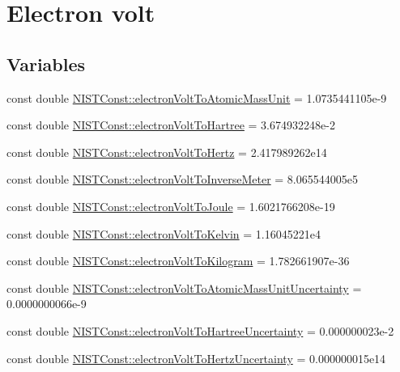 \hypertarget{group___n_i_s_t_const-_electron_volt}{}\section{Electron volt}
\label{group___n_i_s_t_const-_electron_volt}
\subsection*{Variables}
\begin{DoxyCompactItemize}
\item 
const double \hyperlink{group___n_i_s_t_const-_electron_volt_gabd56c1195e7ce2bb9c314e88b43e30ab}{N\+I\+S\+T\+Const\+::electron\+Volt\+To\+Atomic\+Mass\+Unit} = 1.\+0735441105e-\/9
\item 
const double \hyperlink{group___n_i_s_t_const-_electron_volt_gab05ba497cc5a6bd566356469e9de003a}{N\+I\+S\+T\+Const\+::electron\+Volt\+To\+Hartree} = 3.\+674932248e-\/2
\item 
const double \hyperlink{group___n_i_s_t_const-_electron_volt_gae80c1242d33bf681a09a87d20cd4162e}{N\+I\+S\+T\+Const\+::electron\+Volt\+To\+Hertz} = 2.\+417989262e14
\item 
const double \hyperlink{group___n_i_s_t_const-_electron_volt_ga4c109b95727a76ae489a8dec36a88b65}{N\+I\+S\+T\+Const\+::electron\+Volt\+To\+Inverse\+Meter} = 8.\+065544005e5
\item 
const double \hyperlink{group___n_i_s_t_const-_electron_volt_ga51a94280936d8d7e92cbac054e1df485}{N\+I\+S\+T\+Const\+::electron\+Volt\+To\+Joule} = 1.\+6021766208e-\/19
\item 
const double \hyperlink{group___n_i_s_t_const-_electron_volt_ga9cd0e681c5b9edabd2f1840c88d90176}{N\+I\+S\+T\+Const\+::electron\+Volt\+To\+Kelvin} = 1.\+16045221e4
\item 
const double \hyperlink{group___n_i_s_t_const-_electron_volt_ga21481a673cb040e04f7f8f95581ece0c}{N\+I\+S\+T\+Const\+::electron\+Volt\+To\+Kilogram} = 1.\+782661907e-\/36
\item 
const double \hyperlink{group___n_i_s_t_const-_electron_volt_ga0f93985ef9b7a71e0c1e6172d6d041a5}{N\+I\+S\+T\+Const\+::electron\+Volt\+To\+Atomic\+Mass\+Unit\+Uncertainty} = 0.\+0000000066e-\/9
\item 
const double \hyperlink{group___n_i_s_t_const-_electron_volt_ga0abfaf6edc874d80488beab0633f353a}{N\+I\+S\+T\+Const\+::electron\+Volt\+To\+Hartree\+Uncertainty} = 0.\+000000023e-\/2
\item 
const double \hyperlink{group___n_i_s_t_const-_electron_volt_ga78145ffd31aff9041a59d939ce3162d4}{N\+I\+S\+T\+Const\+::electron\+Volt\+To\+Hertz\+Uncertainty} = 0.\+000000015e14

\end{DoxyCompactItemize}
